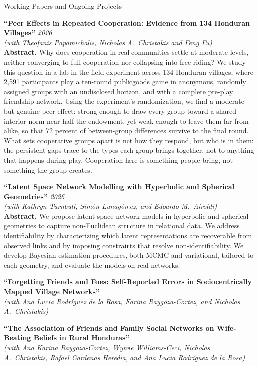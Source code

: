 \documentclass{resume}
\newcommand{\pubtitle}[1]{\textbf{``#1''}}
\begin{document}
\begin{rSection}{Working Papers and Ongoing Projects}

\pubtitle{Peer Effects in Repeated Cooperation:
Evidence from 134 Honduran Villages} \hfill {\em 2026}\\
\textit{(with Theofanis Papamichalis, Nicholas A.\ Christakis and Feng Fu)}\\
{\small \textbf{Abstract.} Why does cooperation in real communities settle at moderate levels, neither converging to
full cooperation nor collapsing into free-riding? We study this question in a lab-in-the-field
experiment across 134 Honduran villages, where 2,591 participants play a ten-round publicgoods
game in anonymous, randomly assigned groups with an undisclosed horizon, and with a
complete pre-play friendship network. Using the experiment’s randomization, we find a moderate
but genuine peer effect: strong enough to draw every group toward a shared interior norm
near half the endowment, yet weak enough to leave them far from alike, so that 72 percent of
between-group differences survive to the final round. What sets cooperative groups apart is not
how they respond, but who is in them: the persistent gaps trace to the types each group brings
together, not to anything that happens during play. Cooperation here is something people bring,
not something the group creates.}

\pubtitle{Latent Space Network Modelling with Hyperbolic and Spherical Geometries} \hfill {\em 2026}\\
\textit{(with Kathryn Turnbull, Sim\'on Lunag\'omez, and Edoardo M.\ Airoldi)}\\
{\small \textbf{Abstract.} We propose latent space network models in hyperbolic and spherical geometries to capture non-Euclidean structure in relational data. We address identifiability by characterizing which latent representations are recoverable from observed links and by imposing constraints that resolve non-identifiability. We develop Bayesian estimation procedures, both MCMC and variational, tailored to each geometry, and evaluate the models on real networks.}

\pubtitle{Forgetting Friends and Foes: Self-Reported Errors in Sociocentrically Mapped Village Networks}\\
\textit{(with Ana Lucia Rodr\'iguez de la Rosa, Karina Raygoza-Cortez, and Nicholas A.\ Christakis)}

\pubtitle{The Association of Friends and Family Social Networks on Wife-Beating Beliefs in Rural Honduras}\\
\textit{(with Ana Karina Raygoza-Cortez, Wynne Williams-Ceci, Nicholas A.\ Christakis, Rafael Cardenas Heredia, and Ana Lucia Rodr\'iguez de la Rosa)}


\end{rSection}
\end{document}
